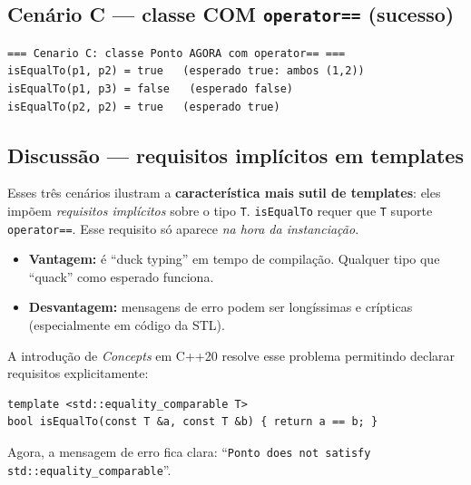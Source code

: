 \documentclass[11pt,a4paper]{article}
\begin{document}
\subsection*{Cen\'ario C --- classe COM \texttt{operator==} (sucesso)}



\begin{saidabox}
\begin{lstlisting}[style=terminal]
=== Cenario C: classe Ponto AGORA com operator== ===
isEqualTo(p1, p2) = true   (esperado true: ambos (1,2))
isEqualTo(p1, p3) = false   (esperado false)
isEqualTo(p2, p2) = true   (esperado true)
\end{lstlisting}
\end{saidabox}\normalcolor

\subsection*{Discuss\~ao --- requisitos impl\'icitos em templates}

Esses tr\^es cen\'arios ilustram a \textbf{caracter\'istica mais sutil de templates}: eles imp\~oem \emph{requisitos impl\'icitos} sobre o tipo \texttt{T}. \texttt{isEqualTo} requer que \texttt{T} suporte \texttt{operator==}. Esse requisito s\'o aparece \emph{na hora da instancia\c{c}\~ao}.

\begin{itemize}[leftmargin=*]
  \item \textbf{Vantagem:} \'e ``duck typing'' em tempo de compila\c{c}\~ao. Qualquer tipo que ``quack'' como esperado funciona.
  \item \textbf{Desvantagem:} mensagens de erro podem ser long\'issimas e cr\'ipticas (especialmente em c\'odigo da STL).
\end{itemize}

\begin{obseng}
A introdu\c{c}\~ao de \emph{Concepts} em C++20 resolve esse problema permitindo declarar requisitos explicitamente:

\begin{lstlisting}[style=cppcode,numbers=none]
template <std::equality_comparable T>
bool isEqualTo(const T &a, const T &b) { return a == b; }
\end{lstlisting}

Agora, a mensagem de erro fica clara: ``\texttt{Ponto does not satisfy std::equality\_comparable}''.
\end{obseng}
\end{document}
